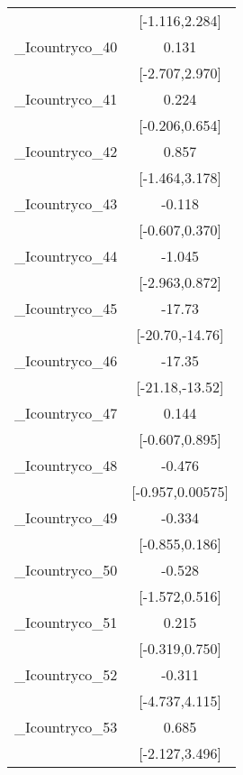 {\begin{tabular}{l*{1}{c}}
            &        [-1.116,2.284]         \\
[1em]
\_Icountryco\_40&                 0.131         \\
            &        [-2.707,2.970]         \\
[1em]
\_Icountryco\_41&                 0.224         \\
            &        [-0.206,0.654]         \\
[1em]
\_Icountryco\_42&                 0.857         \\
            &        [-1.464,3.178]         \\
[1em]
\_Icountryco\_43&                -0.118         \\
            &        [-0.607,0.370]         \\
[1em]
\_Icountryco\_44&                -1.045         \\
            &        [-2.963,0.872]         \\
[1em]
\_Icountryco\_45&                -17.73\sym{***}\\
            &       [-20.70,-14.76]         \\
[1em]
\_Icountryco\_46&                -17.35\sym{***}\\
            &       [-21.18,-13.52]         \\
[1em]
\_Icountryco\_47&                 0.144         \\
            &        [-0.607,0.895]         \\
[1em]
\_Icountryco\_48&                -0.476         \\
            &      [-0.957,0.00575]         \\
[1em]
\_Icountryco\_49&                -0.334         \\
            &        [-0.855,0.186]         \\
[1em]
\_Icountryco\_50&                -0.528         \\
            &        [-1.572,0.516]         \\
[1em]
\_Icountryco\_51&                 0.215         \\
            &        [-0.319,0.750]         \\
[1em]
\_Icountryco\_52&                -0.311         \\
            &        [-4.737,4.115]         \\
[1em]
\_Icountryco\_53&                 0.685         \\
            &        [-2.127,3.496]         \\

\end{tabular}}
